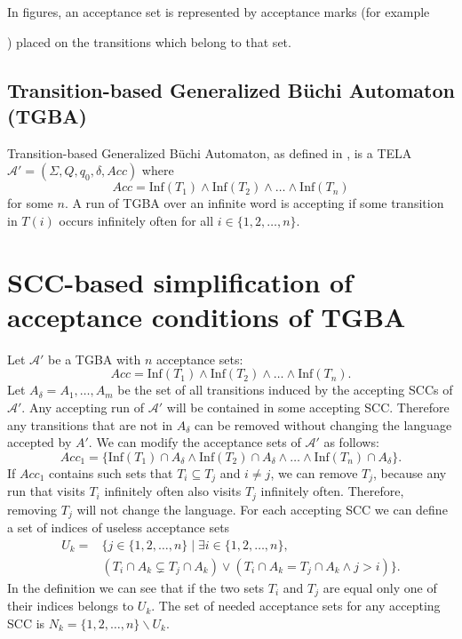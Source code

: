 \documentclass[
  digital, %
  twoside, %
  table,   %
  lof,     %
  lot,     %
]{fithesis3}
\begin{document}
In figures, an acceptance set is represented by acceptance marks (for example 
) placed on the transitions which belong to that set.

\section{Transition-based Generalized Büchi Automaton (TGBA)}
Transition-based Generalized Büchi Automaton, as defined in \cite{bloemen2017}, is a TELA $\mathcal{A'} = (\Sigma, Q, q_0, \delta, Acc)$ where 
\begin{equation*}
  Acc = \text{Inf}(T_1) \wedge \text{Inf}(T_2) \wedge \dots \wedge \text{Inf}(T_n)
\end{equation*} 
for some $n$. A run of TGBA over an infinite word is accepting if some transition in $T(i)$ occurs infinitely often for all $i \in \{1, 2, \dots, n\}$. 

\chapter{SCC-based simplification of acceptance conditions of TGBA} 
Let $\mathcal{A'}$ be a TGBA with $n$ acceptance sets: 
\begin{equation*}
  Acc = \text{Inf}(T_1) \wedge \text{Inf}(T_2) \wedge \dots \wedge \text{Inf}(T_n).
\end{equation*}
Let $A_\delta = A_1, \dots, A_m$ be the set of all transitions induced by the accepting SCCs of $\mathcal{A'}$. 
Any accepting run of $\mathcal{A'}$ will be contained in some accepting SCC. Therefore any transitions that are not in $A_\delta$ can be removed without changing the language accepted by $A'$. We can modify the acceptance sets of $\mathcal{A'}$ as follows: 
\begin{equation*}
  Acc_1 = \{ \text{Inf}(T_1) \cap A_\delta \wedge \text{Inf}(T_2) \cap A_\delta \wedge \dots \wedge \text{Inf}(T_n) \cap A_\delta \}.
\end{equation*}
If $Acc_1$ contains such sets that $T_i \subseteq T_j$ and $i \neq j$, we can remove $T_j$, because any run that visits $T_i$ infinitely often also visits $T_j$ infinitely often. Therefore, removing $T_j$ will not change the language.
For each accepting SCC we can define a set of indices of useless acceptance sets 
\begin{equation*}
  \begin{aligned}
    U_k = &\{ j \in \{1, 2, \dots, n\} \mid \exists i \in \{1, 2, \dots, n\}, \\
    &(T_i \cap A_k \subsetneq T_j \cap A_k) \vee (T_i \cap A_k = T_j \cap A_k \wedge j > i)\}.
  \end{aligned}
\end{equation*}
In the definition we can see that if the two sets $T_i$ and $T_j$ are equal only one of their indices belongs to $U_k$. The set of needed acceptance sets for any accepting SCC is $N_k = \{1, 2, \dots, n\} \smallsetminus U_k$. 
\end{document}
